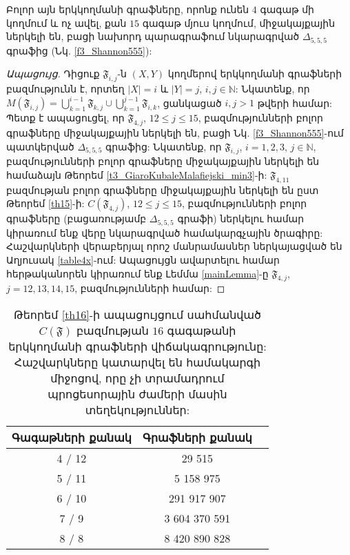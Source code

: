 \begin{theorem}
\label{th4x}
Բոլոր այն երկկողմանի գրաֆները, որոնք ունեն $4$ գագաթ մի կողմում և ոչ ավել, քան $15$ գագաթ մյուս կողմում, միջակայքային ներկելի են, բացի նախորդ պարագրաֆում նկարագրված $\Delta_{5,5,5}$ գրաֆից (Նկ. \ref{f3_Shannon555}):
\end{theorem}
\begin{proof}[Ապացույց]
Դիցուք $\mathfrak{F}_{i,j}$-ն $(X,Y)$ կողմերով երկկողմանի գրաֆների բազմությունն է, որտեղ $|X|=i$ և $|Y| = j$, $i, j \in \mathbb{N}$: Նկատենք, որ $M(\mathfrak{F}_{i,j})=\bigcup\limits_{k=1}^{i-1}{\mathfrak{F}_{k,j}} \cup \bigcup\limits_{k=1}^{j-1}{\mathfrak{F}_{i,k}}$, ցանկացած $i,j>1$ թվերի համար: Պետք է ապացուցել, որ $\mathfrak{F}_{4,j}$, $12 \leq j \leq 15$, բազմությունների բոլոր գրաֆները միջակայքային ներկելի են, բացի Նկ. \ref{f3_Shannon555}-ում պատկերված $\Delta_{5,5,5}$ գրաֆից: Նկատենք, որ $\mathfrak{F}_{i,j}$, $i=1,2,3$, $j \in \mathbb{N}$, բազմությունների բոլոր գրաֆները միջակայքային ներկելի են համաձայն Թեորեմ \ref{t3_GiaroKubaleMalafiejski_min3}-ի: $\mathfrak{F}_{4,11}$ բազմության բոլոր գրաֆները միջակայքային ներկելի են ըստ Թեորեմ \ref{th15}-ի: $C(\mathfrak{F}_{4,j})$, $12 \leq j \leq 15$, բազմությունների բոլոր գրաֆները (բացառությամբ $\Delta_{5,5,5}$ գրաֆի) ներկելու համար կիրառում ենք վերը նկարագրված համակարգչային ծրագիրը: Հաշվարկների վերաբերյալ որոշ մանրամասներ ներկայացված են Աղյուսակ \ref{table4x}-ում: Ապացույցն ավարտելու համար հերթականորեն կիրառում ենք Լեմմա \ref{mainLemma}-ը $\mathfrak{F}_{4,j}$, $j=12,13,14,15$, բազմությունների համար:
\end{proof}

\begin{table}[t]
\renewcommand{\arraystretch}{1.2}
\begin{center}
\begin{tabular}{|c|c|c|}
\hline
Գագաթների քանակ & Գրաֆների քանակ \\
\hline
4 / 12 & 29 515  \\
\hline
5 / 11 & 5 158 975  \\
\hline
6 / 10 & 291 917 907 \\
\hline
7 / 9 & 3 604 370 591 \\
\hline
8 / 8 & 8 420 890 828 \\
\hline
\end{tabular}
\end{center}
\caption{Թեորեմ \ref{th16}-ի ապացույցում սահմանված $C(\mathfrak{F})$ բազմության $16$ գագաթանի երկկողմանի գրաֆների վիճակագրությունը: Հաշվարկները կատարվել են \cite{MamikonyanGithub} համակարգի միջոցով, որը չի տրամադրում պրոցեսորային ժամերի մասին տեղեկություններ:}
\label{table16}
\end{table}

